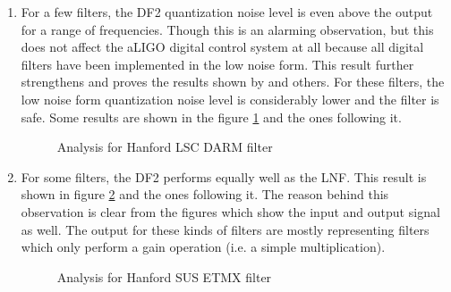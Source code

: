 \documentclass[a4paper,12pt]{article}
\begin{document}
\begin{enumerate}
		\item For a few filters, the DF2 quantization noise level is even above the output for a range of frequencies.  Though this is an alarming observation, but this does not affect the aLIGO digital control system at all because all digital filters have been implemented in the low noise form. This result further strengthens and proves the results shown by \cite{Matts} and others. For these filters, the low noise form quantization noise level is considerably lower and the filter is safe. Some results are shown in the figure \ref{dfbad} and the ones following it.
		\begin{figure}[H]
 
			  \centering
			  \def\svgscale{0.3}
			  \tiny{
			  
			  }
			  \caption{Analysis for Hanford LSC DARM filter}
			 \label{dfbad}
		\end{figure}
% 
%			  
		
		\item For some filters, the DF2 performs equally well as the LNF. This result is shown in figure \ref{bqfdf} and the ones following it. The reason behind this observation is clear from the figures which show the input and output signal as well. The output for these kinds of filters are mostly representing filters which only perform a gain operation (i.e. a simple multiplication).
		\begin{figure}[H]
 
			  \centering
			  \def\svgscale{0.3}
			  \tiny{
			  
			  }
			  \caption{Analysis for Hanford SUS ETMX filter}
			 \label{bqfdf}
		\end{figure}
% 
%			  
	\end{enumerate}
\end{document}
